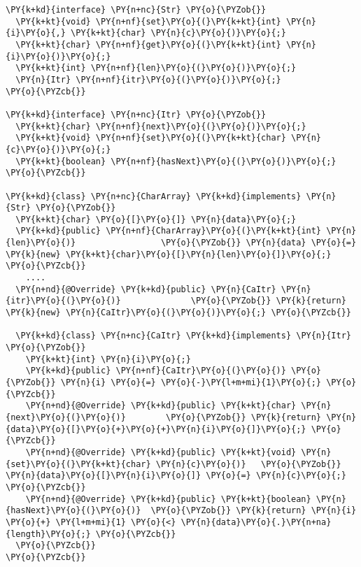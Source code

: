 \begin{Verbatim}[commandchars=\\\{\}]
\PY{k+kd}{interface} \PY{n+nc}{Str} \PY{o}{\PYZob{}}
  \PY{k+kt}{void} \PY{n+nf}{set}\PY{o}{(}\PY{k+kt}{int} \PY{n}{i}\PY{o}{,} \PY{k+kt}{char} \PY{n}{c}\PY{o}{)}\PY{o}{;}
  \PY{k+kt}{char} \PY{n+nf}{get}\PY{o}{(}\PY{k+kt}{int} \PY{n}{i}\PY{o}{)}\PY{o}{;}
  \PY{k+kt}{int} \PY{n+nf}{len}\PY{o}{(}\PY{o}{)}\PY{o}{;}
  \PY{n}{Itr} \PY{n+nf}{itr}\PY{o}{(}\PY{o}{)}\PY{o}{;}
\PY{o}{\PYZcb{}}

\PY{k+kd}{interface} \PY{n+nc}{Itr} \PY{o}{\PYZob{}}
  \PY{k+kt}{char} \PY{n+nf}{next}\PY{o}{(}\PY{o}{)}\PY{o}{;}
  \PY{k+kt}{void} \PY{n+nf}{set}\PY{o}{(}\PY{k+kt}{char} \PY{n}{c}\PY{o}{)}\PY{o}{;} 
  \PY{k+kt}{boolean} \PY{n+nf}{hasNext}\PY{o}{(}\PY{o}{)}\PY{o}{;}
\PY{o}{\PYZcb{}}

\PY{k+kd}{class} \PY{n+nc}{CharArray} \PY{k+kd}{implements} \PY{n}{Str} \PY{o}{\PYZob{}}
  \PY{k+kt}{char} \PY{o}{[}\PY{o}{]} \PY{n}{data}\PY{o}{;}
  \PY{k+kd}{public} \PY{n+nf}{CharArray}\PY{o}{(}\PY{k+kt}{int} \PY{n}{len}\PY{o}{)}                 \PY{o}{\PYZob{}} \PY{n}{data} \PY{o}{=} \PY{k}{new} \PY{k+kt}{char}\PY{o}{[}\PY{n}{len}\PY{o}{]}\PY{o}{;} \PY{o}{\PYZcb{}}
    ....
  \PY{n+nd}{@Override} \PY{k+kd}{public} \PY{n}{CaItr} \PY{n}{itr}\PY{o}{(}\PY{o}{)}              \PY{o}{\PYZob{}} \PY{k}{return} \PY{k}{new} \PY{n}{CaItr}\PY{o}{(}\PY{o}{)}\PY{o}{;} \PY{o}{\PYZcb{}}

  \PY{k+kd}{class} \PY{n+nc}{CaItr} \PY{k+kd}{implements} \PY{n}{Itr} \PY{o}{\PYZob{}}
    \PY{k+kt}{int} \PY{n}{i}\PY{o}{;}
    \PY{k+kd}{public} \PY{n+nf}{CaItr}\PY{o}{(}\PY{o}{)} \PY{o}{\PYZob{}} \PY{n}{i} \PY{o}{=} \PY{o}{-}\PY{l+m+mi}{1}\PY{o}{;} \PY{o}{\PYZcb{}}
    \PY{n+nd}{@Override} \PY{k+kd}{public} \PY{k+kt}{char} \PY{n}{next}\PY{o}{(}\PY{o}{)}        \PY{o}{\PYZob{}} \PY{k}{return} \PY{n}{data}\PY{o}{[}\PY{o}{+}\PY{o}{+}\PY{n}{i}\PY{o}{]}\PY{o}{;} \PY{o}{\PYZcb{}}
    \PY{n+nd}{@Override} \PY{k+kd}{public} \PY{k+kt}{void} \PY{n}{set}\PY{o}{(}\PY{k+kt}{char} \PY{n}{c}\PY{o}{)}   \PY{o}{\PYZob{}} \PY{n}{data}\PY{o}{[}\PY{n}{i}\PY{o}{]} \PY{o}{=} \PY{n}{c}\PY{o}{;} \PY{o}{\PYZcb{}}
    \PY{n+nd}{@Override} \PY{k+kd}{public} \PY{k+kt}{boolean} \PY{n}{hasNext}\PY{o}{(}\PY{o}{)}  \PY{o}{\PYZob{}} \PY{k}{return} \PY{n}{i} \PY{o}{+} \PY{l+m+mi}{1} \PY{o}{<} \PY{n}{data}\PY{o}{.}\PY{n+na}{length}\PY{o}{;} \PY{o}{\PYZcb{}}
  \PY{o}{\PYZcb{}}
\PY{o}{\PYZcb{}}


\end{Verbatim}
